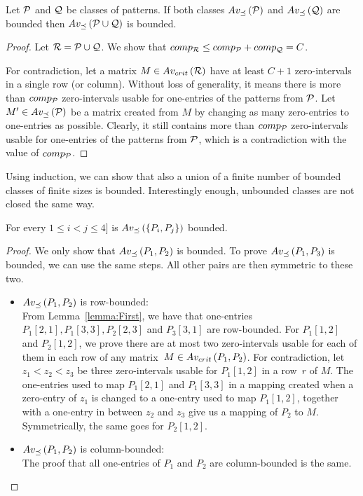 \begin{thm}
\label{thm:boundunion}
Let $\mathcal{P}$ and $\mathcal{Q}$ be classes of patterns. If both classes $Av_{\preceq}\left(\mathcal{P}\right)$ and $Av_{\preceq}\left(\mathcal{Q}\right)$ are bounded then $Av_{\preceq}\left(\mathcal{P}\cup\mathcal{Q}\right)$ is bounded.
\end{thm}
\begin{proof}
Let $\mathcal{R}=\mathcal{P}\cup\mathcal{Q}$. We show that $comp_{\mathcal{R}}\leq comp_\mathcal{P}+comp_\mathcal{Q}=C$.

For contradiction, let a matrix $M\in Av_{crit}\left(\mathcal{R}\right)$ have at least $C+1$ zero-intervals in a single row (or column). Without loss of generality, it means there is more than $comp_{\mathcal{P}}$ zero-intervals usable for one-entries of the patterns from $\mathcal{P}$. Let $M'\in Av_{\preceq}\left(\mathcal{P}\right)$ be a matrix created from $M$ by changing as many zero-entries to one-entries as possible. Clearly, it still contains more than $comp_{\mathcal{P}}$ zero-intervals usable for one-entries of the patterns from $\mathcal{P}$, which is a contradiction with the value of $comp_{\mathcal{P}}$.
\end{proof}

Using induction, we can show that also a union of a finite number of bounded classes of finite sizes is bounded. Interestingly enough, unbounded classes are not closed the same way.

\begin{thm}
For every $1\leq i<j\leq4]$ is $Av_{\preceq}\left(\{P_i,P_j\}\right)$ bounded.
\end{thm}
\begin{proof}
We only show that $Av_{\preceq}\left(P_1,P_2\right)$ is bounded. To prove $Av_{\preceq}\left(P_1,P_3\right)$ is bounded, we can use the same steps. All other pairs are then symmetric to these two.
\begin{itemize}
	\item $Av_{\preceq}\left(P_1,P_2\right)$ is row-bounded:\\
	From Lemma~\ref{lemma:First}, we have that one-entries $P_1[2,1],P_1[3,3],P_2[2,3]$ and $P_3[3,1]$ are row-bounded. For $P_1[1,2]$ and $P_2[1,2]$, we prove there are at most two zero-intervals usable for each of them in each row of any matrix~$M\in Av_{crit}\left(P_1,P_2\right)$. For contradiction, let $z_1<z_2<z_3$ be three zero-intervals usable for $P_1[1,2]$ in a row~$r$ of $M$. The one-entries used to map $P_1[2,1]$ and $P_1[3,3]$ in a mapping created when a zero-entry of $z_1$ is changed to a one-entry used to map $P_1[1,2]$, together with a one-entry in between $z_2$ and $z_3$ give us a mapping of $P_2$ to $M$. Symmetrically, the same goes for $P_2[1,2]$.
	\item $Av_{\preceq}\left(P_1,P_2\right)$ is column-bounded:\\
	The proof that all one-entries of $P_1$ and $P_2$ are column-bounded is the same.
\end{itemize}
\end{proof}

